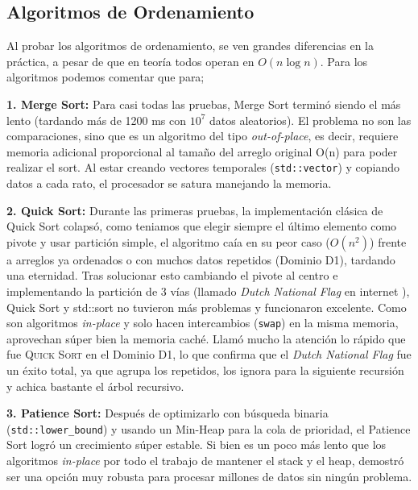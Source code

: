 \subsection{Algoritmos de Ordenamiento}

Al probar los algoritmos de ordenamiento, se ven grandes diferencias en la práctica, a pesar de que en teoría todos operan en $O(n \log n)$. Para los algoritmos podemos comentar que para;

\textbf{1. Merge Sort:} 
Para casi todas las pruebas, Merge Sort terminó siendo el más lento (tardando más de 1200 ms con $10^7$ datos aleatorios). El problema no son las comparaciones,
sino que es un algoritmo del tipo \textit{out-of-place}, es decir, requiere memoria adicional proporcional al tamaño del arreglo original O(n) para poder realizar el sort.
Al estar creando vectores temporales (\texttt{std::vector}) y copiando datos a cada rato, el procesador se satura manejando la memoria.

\textbf{2. Quick Sort:}
Durante las primeras pruebas, la implementación clásica de Quick Sort \cite{gfg_quick_sort} colapsó, como teniamos que elegir siempre el último elemento como pivote y usar partición simple,
el algoritmo caía en su peor caso ($O(n^2)$) frente a arreglos ya ordenados o con muchos datos repetidos (Dominio D1), tardando una eternidad.
Tras solucionar esto cambiando el pivote al centro e implementando la partición de 3 vías (llamado \textit{Dutch National Flag} en internet \cite{gfg_3way_quicksort}),
Quick Sort y std::sort no tuvieron más problemas y funcionaron excelente. Como son algoritmos \textit{in-place} y solo hacen intercambios (\texttt{swap}) en la misma memoria,
aprovechan súper bien la memoria caché. Llamó mucho la atención lo rápido que fue \textsc{Quick Sort} en el Dominio D1, lo que confirma que el \textit{Dutch National Flag}
fue un éxito total, ya que agrupa los repetidos, los ignora para la siguiente recursión y achica bastante el árbol recursivo.

\textbf{3. Patience Sort:}
Después de optimizarlo con búsqueda binaria (\texttt{std::lower\_bound}) y usando un Min-Heap para la cola de prioridad, el Patience Sort logró un crecimiento súper estable.
Si bien es un poco más lento que los algoritmos \textit{in-place} por todo el trabajo de mantener el stack y el heap,
demostró ser una opción muy robusta para procesar millones de datos sin ningún problema.

